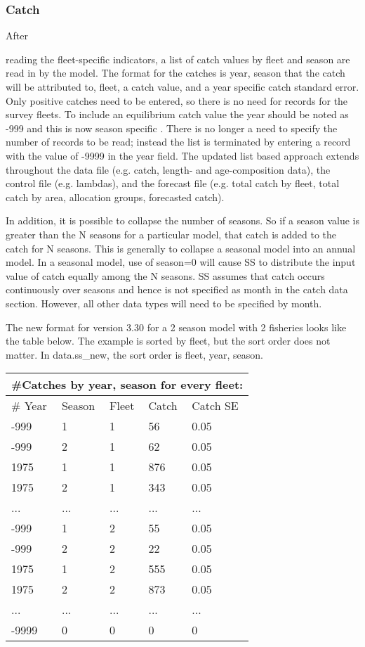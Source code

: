 \subsubsection{Catch}
\hypertarget{CatchFormat}{After} reading the fleet-specific indicators, a list of catch values by fleet and season are read in by the model.  The format for the catches is year, season that the catch will be attributed to, fleet, a catch value, and a year specific catch standard error.   Only positive catches need to be entered, so there is no need for records for the survey fleets.  To include an equilibrium catch value the year should be noted as -999 and this is now season specific .  \hypertarget{ListBased}{There} is no longer a need to specify the number of records to be read; instead the list is terminated by entering a record with the value of -9999 in the year field. The updated list based approach extends throughout the data file (e.g. catch, length- and age-composition data), the control file (e.g. lambdas), and the forecast file (e.g. total catch by fleet, total catch by area, allocation groups, forecasted catch).

In addition, it is possible to collapse the number of seasons.  So if a season value is greater than the N seasons for a particular model, that catch is added to the catch for N seasons.  This is generally to collapse a seasonal model into an annual model.  In a seasonal model, use of season=0 will cause SS to distribute the input value of catch equally among the N seasons.  SS assumes that catch occurs continuously over seasons and hence is not specified as month in the catch data section.  However, all other data types will need to be specified by month.

The new format for version 3.30 for a 2 season model with 2 fisheries looks like the table below.  The example is sorted by fleet, but the sort order does not matter.  In data.ss\_new, the sort order is fleet, year, season.

\begin{center}
	\begin{tabular}{p{3cm} p{3cm} p{3cm} p{3cm} p{2cm}}
		\multicolumn{5}{l}{\#Catches by year, season for every fleet:}\\
		\hline
		\# Year & Season & Fleet & Catch & Catch SE \\
		\hline
		-999 & 1 & 1 & 56  & 0.05 \\
		-999 & 2 & 1 & 62  & 0.05 \\
		1975 & 1 & 1 & 876 & 0.05 \\
		1975 & 2 & 1 & 343 & 0.05 \\
		...  & ...   & ...   & ...   & ...  \\
		-999 & 1 & 2 & 55  & 0.05 \\
		-999 & 2 & 2 & 22  & 0.05 \\
		1975 & 1 & 2 & 555 & 0.05 \\
		1975 & 2 & 2 & 873 & 0.05 \\
		...  & ...   & ...   & ...   & ...  \\
		-9999 & 0 & 0 & 0 & 0 \\
		\hline
	\end{tabular}
\end{center}

